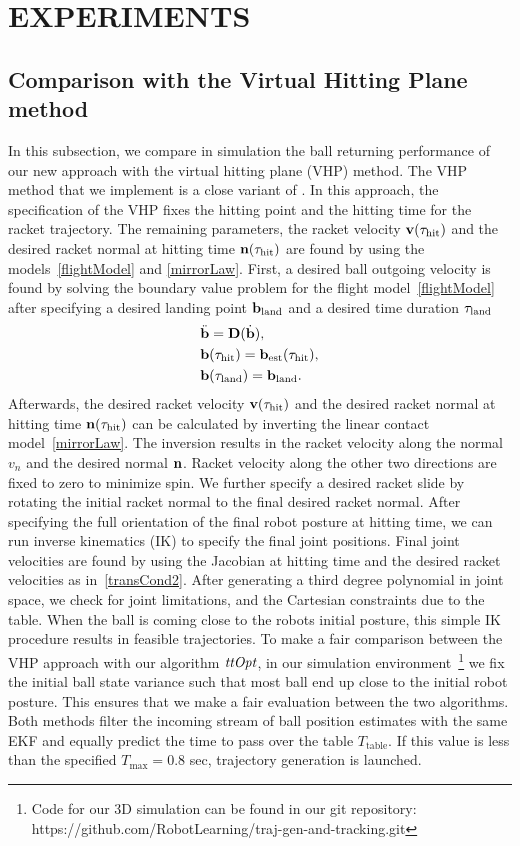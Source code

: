 \section{EXPERIMENTS}\label{results}

\subsection{Comparison with the Virtual Hitting Plane method}

In this subsection, we compare in simulation the ball returning performance of our new approach with the virtual hitting plane (VHP) method. The VHP method that we implement is a close variant of \cite{Muelling13}. In this approach, the specification of the VHP fixes the hitting point and the hitting time for the racket trajectory. The remaining parameters, the racket velocity $\boldsymbol{\mathrm{v}}(\tau_{\mathrm{hit}})$ and the desired racket normal at hitting time $\boldsymbol{\mathrm{n}}(\tau_{\mathrm{hit}})$ are found by using the models~\eqref{flightModel} and \eqref{mirrorLaw}. First, a desired ball outgoing velocity is found by solving the boundary value problem for the flight model~\eqref{flightModel} after specifying a desired landing point $\boldsymbol{\mathrm{b}}_{\mathrm{land}}$ and a desired time duration $\tau_{\mathrm{land}}$
%
\begin{align}
&\ddot{\boldsymbol{\mathrm{b}}} = \boldsymbol{\mathrm{D}}(\dot{\boldsymbol{\mathrm{b}}}), \\
&\boldsymbol{\mathrm{b}}(\tau_{\mathrm{hit}}) = \boldsymbol{\mathrm{b}}_{\mathrm{est}}(\tau_{\mathrm{hit}}), \\
&\boldsymbol{\mathrm{b}}(\tau_{\mathrm{land}}) = \boldsymbol{\mathrm{b}}_{\mathrm{land}}.
\label{bvp}
\end{align}
%
Afterwards, the desired racket velocity $\boldsymbol{\mathrm{v}}(\tau_{\mathrm{hit}})$ and the desired racket normal at hitting time $\boldsymbol{\mathrm{n}}(\tau_{\mathrm{hit}})$ can be calculated by inverting the linear contact model~\eqref{mirrorLaw}. The inversion results in the racket velocity along the normal $v_n$ and the desired normal $\boldsymbol{\mathrm{n}}$. Racket velocity along the other two directions are fixed to zero to minimize spin.
%
We further specify a desired racket slide by rotating the initial racket normal to the final desired racket normal. After specifying the full orientation of the final robot posture at hitting time, we can run inverse kinematics (IK) to specify the final joint positions. Final joint velocities are found by using the Jacobian at hitting time and the desired racket velocities as in~\eqref{transCond2}. After generating a third degree polynomial in joint space, we check for joint limitations, and the Cartesian constraints due to the table. When the ball is coming close to the robots initial posture, this simple IK procedure results in feasible trajectories.
%
To make a fair comparison between the VHP approach with our algorithm $\emph{ttOpt}$, in our simulation environment~\footnote{Code for our 3D simulation can be found in our git repository: https://github.com/RobotLearning/traj-gen-and-tracking.git} we fix the initial ball state variance such that most ball end up close to the initial robot posture. This ensures that we make a fair evaluation between the two algorithms. Both methods filter the incoming stream of ball position estimates with the same EKF and equally predict the time to pass over the table $T_{\mathrm{table}}$. If this value is less than the specified $T_{\mathrm{max}} = 0.8$ sec, trajectory generation is launched.

